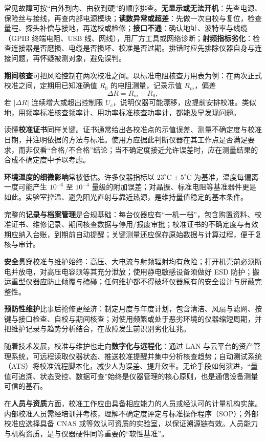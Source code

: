 常见故障可按“由外到内、由软到硬”的顺序排查。\textbf{无显示或无法开机}：先查电源、保险丝与接线，再查内部电源模块；\textbf{读数异常或超差}：先做一次自校与复位，检查量程、探头补偿与接地，再送校或检修；\textbf{接口不通}：确认地址、波特率与线缆（GPIB 终端电阻、USB 线、网线），用厂方工具或网络诊断；\textbf{射频指标劣化}：检查连接器是否磨损、电缆是否损坏、校准是否过期。排错时应先排除仪器自身与连接问题，再怀疑被测对象，避免误判。

\textbf{期间核查}可把风险控制在两次校准之间。以标准电阻核查万用表为例：在两次正式校准之间，定期用已知准确值 $R_0$ 的电阻测量，记录示值 $R_m$，偏差
\[
    \Delta R = R_m - R_0 ,
\]
若 $|\Delta R|$ 连续增大或超出控制限 $U_c$，说明仪器可能漂移，应提前安排校准。类似地，用频率标准核查频率计、用功率标准核查功率计，都能及早发现问题。

读懂\textbf{校准证书}同样关键。证书通常给出各校准点的示值误差、测量不确定度与校准日期，并注明依据的方法与标准。使用方应据此判断仪器在其工作点是否满足要求，而非仅看“合格/不合格”结论；当不确定度接近允许误差时，应在测量结果的合成不确定度中予以考虑。

\textbf{环境温度的细微影响}常被低估。许多仪器指标以 $23^\circ\mathrm{C}\pm5^\circ\mathrm{C}$ 为基准，温度每偏离一度可能产生 $10^{-6}$ 至 $10^{-4}$ 量级的附加误差；对晶振、标准电阻等基准器件更是如此。实验室控温、避免阳光直射与靠近热源，是维持量值稳定的基本条件。

完整的\textbf{记录与档案管理}是合规基础：每台仪器应有“一机一档”，包含购置资料、校准证书、维修记录、期间核查数据与停用/报废审批；校准证书的不确定度与有效期应纳入台账，到期前自动提醒；关键测量还应保存原始数据与计算过程，便于复核与审计。

\textbf{安全}贯穿校准与维护始终：高压、大电流与射频辐射均有危险；打开机壳前必须断电并放电，对高压电容须等其充分泄放；使用静电敏感设备须做好 ESD 防护；搬运重型仪器应防止倾覆与磕碰；任何维护都不得破坏仪器原有的安全设计与屏蔽完整性。

\textbf{预防性维护}比事后抢修更经济：制定月度与年度计划，包含清洁、风扇与滤网、按键与接口检查、自校与期间核查；对使用频繁或处于恶劣环境的仪器缩短周期，并把维护记录与趋势分析结合，在故障发生前识别劣化征兆。

随着技术发展，校准与维护也走向\textbf{数字化与远程化}：通过 LAN 与云平台的资产管理系统，可远程读取仪器状态、推送校准提醒并集中分析核查趋势；自动测试系统（ATS）将校准流程脚本化，减少人为误差、提升效率。无论手段如何演进，“量值可追溯、状态受控、数据可查”始终是仪器管理的核心原则，也是通信设备测量可信的基石。

在\textbf{人员与资质}方面，校准工作应由具备相应能力的人员或经认可的计量机构实施。内部校准人员需经培训并考核，理解不确定度评定与标准操作程序（SOP）；外部校准应选择具备 CNAS 或等效认可资质的实验室，以保证溯源链有效。人员能力与机构资质，是与仪器硬件同等重要的“软性基准”。

